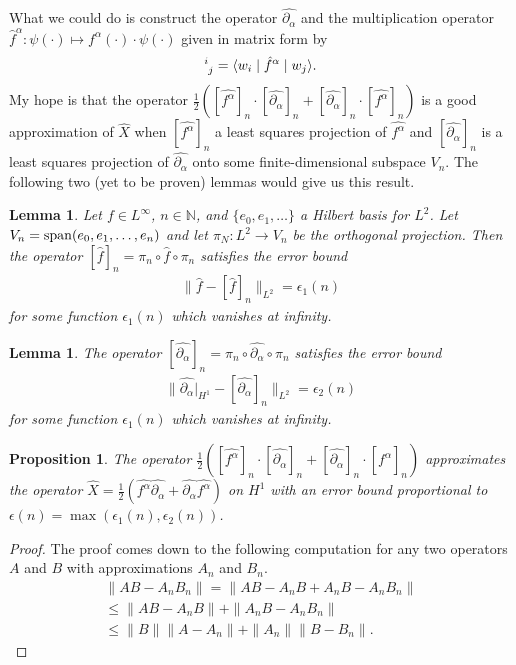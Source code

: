 \documentclass[12pt]{amsart}
\newtheorem{prop}[thm]{Proposition}
\newtheorem{lem}[thm]{Lemma}
\begin{document}
What we could do is construct the operator $\widehat{\partial_\alpha}$
and the multiplication operator $\hat{f}^\alpha: \psi(\cdot ) \mapsto f^\alpha(\cdot) \cdot \psi(\cdot)$ given in matrix form by
\begin{align*}
	[\hat{f}^\alpha]\indices{^i_j} = \langle w_i \mid \hat{f}^\alpha \mid w_j \rangle.
\end{align*}
My hope is that the operator $\frac{1}{2} ( [\widehat{f^\alpha}]_n \cdot [\widehat{\partial_\alpha}]_n + [\widehat{\partial_\alpha}]_n \cdot [\widehat{f^\alpha}]_n)$ is a good approximation of $\widehat{X}$
when $[\widehat{f^\alpha}]_n$ a least squares projection of $\widehat{f^\alpha}$ and $[\widehat{\partial_\alpha}]_n$ is a least squares projection of $\widehat{\partial_\alpha}$ onto some finite-dimensional subspace $V_n$.  The following two (yet to be proven) lemmas would give us this result.

\begin{lem}
	Let $f \in L^{\infty}$, $n \in \mathbb{N}$, and
	$\{ e_0,e_1,\dots \}$ a Hilbert basis for $L^2$.
	Let $V_n = {\rm span}( e_0 , e_1,\dots,e_n)$ and let
	$\pi_N : L^2 \to V_n$ be the orthogonal projection.
	Then the operator $[\hat{f}]_n = \pi_n \circ \hat{f} \circ \pi_n$
	satisfies the error bound
	\begin{align*}
		\| \hat{f} - [\hat{f}]_n \|_{L^2} = \epsilon_1(n)
	\end{align*}
	for some function $\epsilon_1(n)$ which vanishes at infinity.
\end{lem}

\begin{lem}
	The operator $[\widehat{\partial_\alpha}]_n = \pi_n \circ \widehat{\partial_\alpha} \circ \pi_n$
	satisfies the error bound
	\begin{align*}
		\| \widehat{\partial_\alpha}|_{H^1} - [\widehat{\partial_\alpha}]_n \|_{L^2} = \epsilon_2(n)
	\end{align*}
	for some function $\epsilon_1(n)$ which vanishes at infinity.
\end{lem}

\begin{prop}
	The operator $\frac{1}{2} ( [\widehat{f^\alpha}]_n \cdot [\widehat{\partial_\alpha}]_n + [\widehat{\partial_\alpha}]_n \cdot [\widehat{f^\alpha}]_n)$
	approximates the operator $\widehat{X} = \frac{1}{2}( \widehat{f^\alpha}  \widehat{\partial_\alpha} +  \widehat{\partial_\alpha}  \widehat{f^\alpha} )$
	on $H^1$	with an error bound proportional to $\epsilon(n) = \max( \epsilon_1(n) , \epsilon_2(n) )$.
\end{prop}
\begin{proof}
	The proof comes down to the following computation for any two operators $A$ and $B$ with approximations $A_n$ and $B_n$.
	\begin{align*}
		\| AB - A_n B_n \| = \| AB - A_n B + A_n B- A_n B_n \| \\
		\leq \| AB - A_n B \| + \| A_nB - A_n B_n \| \\
		\leq \|B \| \|A - A_n \| + \|A_n \| \|B - B_n \|.
	\end{align*}
\end{proof}



\end{document}
